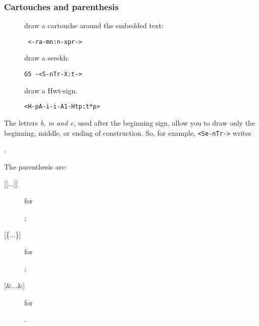 \documentclass[final]{article}
\def\htimage#1{{#1\relax}}
\begin{document}
\subsubsection{Cartouches and parenthesis}

\begin{description}
\item[\tt <- and ->] draw a cartouche around the embedded text:
\begin{verbatim}
 <-ra-mn:n-xpr->
\end{verbatim}
  \begin{hieroglyph}{\leavevmode {}%
}\end{hieroglyph}

  
\item[\tt <S and >] draw a serekh: 
\begin{verbatim}
G5 -<S-nTr-X:t->
\end{verbatim}
  \begin{hieroglyph}{\leavevmode {}\HwordSpace
{}%
}\end{hieroglyph}
  

\item[\tt <H >] draw a \htimage{\eg Hwt-}sign.
\begin{verbatim}
<H-pA-i-i-A1-Htp:t*p>
\end{verbatim}
  \begin{hieroglyph}{\leavevmode {}%
}\end{hieroglyph}
\end{description}
The letters {\em b, m and e,} used after the beginning sign, allow you
to draw only the beginning, middle, or ending of construction. 
So, for example, 
\verb/<Se-nTr->/ writes
\begin{hieroglyph}{\leavevmode {}%
}\end{hieroglyph}.

The parenthesis are:
\begin{description}
\item[{[[...]]}] for 
  \begin{hieroglyph}{\leavevmode {}%
}\end{hieroglyph};
\item[{[\{...\}]}] for 
  \begin{hieroglyph}{\leavevmode {}%
}\end{hieroglyph};
\item[{[\&...\&]}] for 
  \begin{hieroglyph}{\leavevmode {}%
}\end{hieroglyph}.
\end{description}
\end{document}

